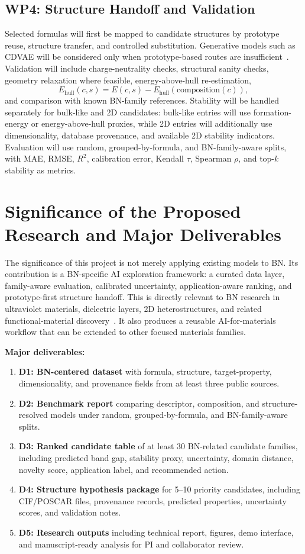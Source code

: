 \documentclass[10pt,a4paper]{article}
\newcommand{\ehull}{E_{\mathrm{hull}}}
\begin{document}
\subsection{WP4: Structure Handoff and Validation}
Selected formulas will first be mapped to candidate structures by prototype reuse, structure transfer, and controlled substitution. Generative models such as CDVAE will be considered only when prototype-based routes are insufficient~\cite{xie2022_cdvae}. Validation will include charge-neutrality checks, structural sanity checks, geometry relaxation where feasible, energy-above-hull re-estimation,
\[
  \ehull(c,s)=E(c,s)-E_{\mathrm{hull}}(\mathrm{composition}(c)),
\]
and comparison with known BN-family references. Stability will be handled separately for bulk-like and 2D candidates: bulk-like entries will use formation-energy or energy-above-hull proxies, while 2D entries will additionally use dimensionality, database provenance, and available 2D stability indicators. Evaluation will use random, grouped-by-formula, and BN-family-aware splits, with MAE, RMSE, $R^2$, calibration error, Kendall $\tau$, Spearman $\rho$, and top-$k$ stability as metrics.

\section{Significance of the Proposed Research and Major Deliverables}
The significance of this project is not merely applying existing models to BN. Its contribution is a BN-specific AI exploration framework: a curated data layer, family-aware evaluation, calibrated uncertainty, application-aware ranking, and prototype-first structure handoff. This is directly relevant to BN research in ultraviolet materials, dielectric layers, 2D heterostructures, and related functional-material discovery~\cite{watanabe2004_hbn_uv,cassabois2016_hbn_indirect,dean2010_hbn_graphene}. It also produces a reusable AI-for-materials workflow that can be extended to other focused materials families.

\textbf{Major deliverables:}
\begin{enumerate}[leftmargin=*]
  \item \textbf{D1: BN-centered dataset} with formula, structure, target-property, dimensionality, and provenance fields from at least three public sources.
  \item \textbf{D2: Benchmark report} comparing descriptor, composition, and structure-resolved models under random, grouped-by-formula, and BN-family-aware splits.
  \item \textbf{D3: Ranked candidate table} of at least 30 BN-related candidate families, including predicted band gap, stability proxy, uncertainty, domain distance, novelty score, application label, and recommended action.
  \item \textbf{D4: Structure hypothesis package} for 5--10 priority candidates, including CIF/POSCAR files, provenance records, predicted properties, uncertainty scores, and validation notes.
  \item \textbf{D5: Research outputs} including technical report, figures, demo interface, and manuscript-ready analysis for PI and collaborator review.
\end{enumerate}
\end{document}
